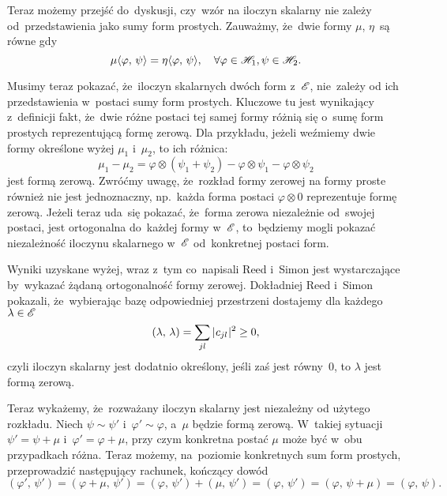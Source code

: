 \documentclass[a4paper,11pt]{article}
\begin{document}
Teraz możemy przejść do~dyskusji, czy~wzór na iloczyn skalarny nie
zależy od~przedstawienia jako sumy form prostych. Zauważmy, że~dwie
formy $\mu$, $\eta$~są równe gdy
\begin{equation}
  \label{eq:RS-Vol-I-s01-37}
  \mu\langle \varphi, \, \psi \rangle = \eta\langle \varphi, \, \psi \rangle, \quad
  \forall \varphi \in \mathcal{H}_{ 1 }, \psi \in \mathcal{H}_{ 2 }.
\end{equation}

Musimy teraz pokazać, że~iloczyn skalarnych dwóch form z~$\mathcal{E}$,
nie~zależy od ich przedstawienia w~postaci sumy form prostych.
Kluczowe tu jest wynikający z~definicji fakt, że~dwie różne postaci
tej samej formy różnią się o~sumę form prostych reprezentującą formę
zerową. Dla przykładu, jeżeli weźmiemy dwie formy określone wyżej
$\mu_{ 1 }$ i~$\mu_{ 2 }$, to ich różnica:
\begin{equation}
  \label{eq:RS-Vol-I-s01-38}
  \mu_{ 1 } - \mu_{ 2 } =
  \varphi \otimes ( \psi_{ 1 } + \psi_{ 2 } ) - \varphi \otimes \psi_{ 1 } - \varphi \otimes \psi_{ 2 }
\end{equation}
jest formą zerową. Zwróćmy uwagę, że~rozkład formy zerowej na formy
proste również nie jest jednoznaczny, np.~każda forma postaci
$\varphi \otimes 0$ reprezentuje formę zerową. Jeżeli teraz uda~się pokazać,
że~forma zerowa niezależnie od~swojej postaci, jest ortogonalna
do~każdej formy w~$\mathcal{E}$, to~będziemy mogli pokazać niezależność
iloczynu skalarnego w~$\mathcal{E}$ od~konkretnej postaci form.

Wyniki uzyskane wyżej, wraz z~tym co~napisali Reed i~Simon jest
wystarczające by~wykazać żądaną ortogonalność formy zerowej.
Dokładniej Reed i~Simon pokazali, że~wybierając bazę odpowiedniej
przestrzeni dostajemy dla każdego $\lambda \in \mathcal{E}$
\begin{equation}
  \label{eq:RS-Vol-I-s01-39}
  ( \lambda, \, \lambda ) = \sum_{ j l } | \hspace{0.05em}  c_{ j l }  \hspace{0.05em} |^{ 2 } \geq 0,
\end{equation}
czyli iloczyn skalarny jest dodatnio określony, jeśli zaś jest
równy~0, to $\lambda$ jest formą zerową.

Teraz wykażemy, że~rozważany iloczyn skalarny jest niezależny od
użytego rozkładu. Niech $\psi \sim \psi'$ i~$\varphi' \sim \varphi$, a~$\mu$
będzie formą zerową. W~takiej sytuacji $\psi' = \psi + \mu$
i~$\varphi' = \varphi + \mu$, przy czym konkretna postać $\mu$ może być w~obu
przypadkach różna. Teraz możemy, na~poziomie konkretnych sum form
prostych, przeprowadzić następujący rachunek, kończący dowód
\begin{equation}
  \label{eq:RS-Vol-I-s01-40}
  ( \varphi', \, \psi' ) = ( \varphi + \mu, \, \psi' )
  = ( \varphi, \, \psi' ) + ( \mu, \, \psi' ) = ( \varphi, \, \psi' )
  = ( \varphi, \, \psi + \mu ) = ( \varphi, \, \psi ).
\end{equation}
\end{document}
